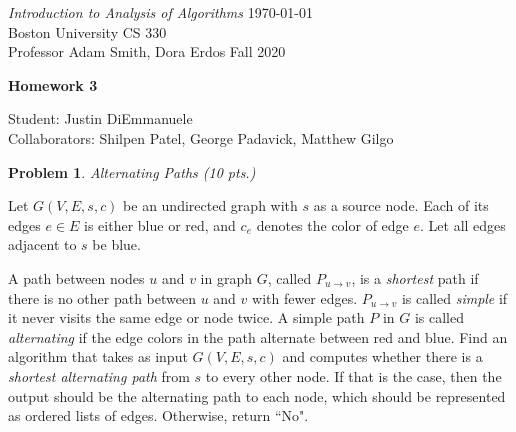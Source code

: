 \documentclass[letterpaper,11pt]{article}
\newtheorem{problem}{Problem}
\begin{document}
{\noindent\large
{\em Introduction to Analysis of Algorithms} \hfill \today\\
Boston University \hfill CS 330\\
Professor  Adam Smith, Dora Erdos \hfill Fall 2020\\}
\vspace{1pt}
\hrulefill\vspace{3mm}
\begin{center}
{\LARGE\bf Homework 3}

\begin{center}
    \color{teal}
   Student: Justin DiEmmanuele \\
    Collaborators: Shilpen Patel, George Padavick, Matthew Gilgo
\end{center}


\end{center}


\begin{problem}
 Alternating Paths (10 pts.)
\end{problem}

Let $G(V,E, s, c)$ be an undirected graph with $s$ as a source node.  Each of its edges $e \in E$ is either blue or red, and $c_e$ denotes the color of edge $e$. Let all edges adjacent to $s$ be blue. 

A path between nodes $u$ and $v$ in graph $G$, called $P_{u \rightarrow v}$, is a \emph{shortest} path if there is no other path between $u$ and $v$ with fewer edges. $P_{u \rightarrow v}$ is called \emph{simple} if it never visits the same edge or node twice.  A simple path $P$ in $G$ is called \emph{alternating} if the edge colors in the path alternate between red and blue.  Find an algorithm that takes as input $G(V,E, s, c)$ and computes whether there is a \emph{shortest alternating path} from $s$ to every other node. If that is the case, then the output should be the alternating path to each node, which should be represented as ordered lists of edges.  Otherwise, return ``No". 
\end{document}
